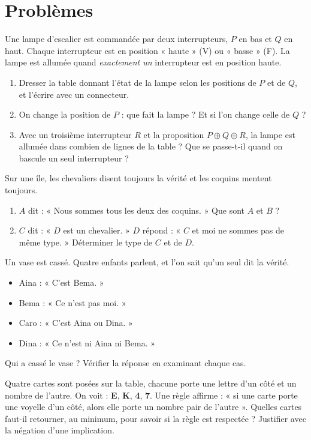 \section{Problèmes}
\begin{exercise}
Une lampe d'escalier est commandée par deux interrupteurs, $P$ en bas et $Q$ en haut. Chaque interrupteur est en position « haute » (V) ou « basse » (F). La lampe est allumée quand \emph{exactement un} interrupteur est en position haute.
\begin{enumerate}
\item Dresser la table donnant l'état de la lampe selon les positions de $P$ et de $Q$, et l'écrire avec un connecteur.
\item On change la position de $P$ : que fait la lampe ? Et si l'on change celle de $Q$ ?
\item Avec un troisième interrupteur $R$ et la proposition $P\oplus Q\oplus R$, la lampe est allumée dans combien de lignes de la table ? Que se passe-t-il quand on bascule un seul interrupteur ?
\end{enumerate}
\end{exercise}
\begin{exercise}
Sur une île, les chevaliers disent toujours la vérité et les coquins mentent toujours.
\begin{enumerate}
\item $A$ dit : « Nous sommes tous les deux des coquins. » Que sont $A$ et $B$ ?
\item $C$ dit : « $D$ est un chevalier. » $D$ répond : « $C$ et moi ne sommes pas de même type. » Déterminer le type de $C$ et de $D$.
\end{enumerate}
\end{exercise}
\begin{exercise}
Un vase est cassé. Quatre enfants parlent, et l'on sait qu'un seul dit la vérité.
\begin{itemize}
\item Aina : « C'est Bema. »
\item Bema : « Ce n'est pas moi. »
\item Caro : « C'est Aina ou Dina. »
\item Dina : « Ce n'est ni Aina ni Bema. »
\end{itemize}
Qui a cassé le vase ? Vérifier la réponse en examinant chaque cas.
\end{exercise}
\begin{exercise}
Quatre cartes sont posées sur la table, chacune porte une lettre d'un côté et un nombre de l'autre. On voit : \textbf{E}, \textbf{K}, \textbf{4}, \textbf{7}. Une règle affirme : « si une carte porte une voyelle d'un côté, alors elle porte un nombre pair de l'autre ». Quelles cartes faut-il retourner, au minimum, pour savoir si la règle est respectée ? Justifier avec la négation d'une implication.
\end{exercise}

